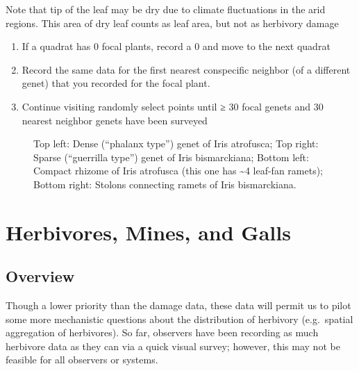 \documentclass[
  letterpaper,
  DIV=11,
  numbers=noendperiod]{scrreprt}
\begin{document}
Note that tip of the leaf may be dry due to climate fluctuations in the
arid regions. This area of dry leaf counts as leaf area, but not as
herbivory damage

\begin{enumerate}
\def\labelenumi{\arabic{enumi}.}
\setcounter{enumi}{1}
\item
  If a quadrat has 0 focal plants, record a 0 and move to the next
  quadrat
\item
  Record the same data for the first nearest conspecific neighbor (of a
  different genet) that you recorded for the focal plant.
\item
  Continue visiting randomly select points until ≥ 30 focal genets and
  30 nearest neighbor genets have been surveyed
\end{enumerate}

\begin{figure}


\caption{\label{fig-rhizo}Top left: Dense (``phalanx type'') genet of
Iris atrofusca; Top right: Sparse (``guerrilla type'') genet of Iris
bismarckiana; Bottom left: Compact rhizome of Iris atrofusca (this one
has \textasciitilde4 leaf-fan ramets); Bottom right: Stolons connecting
ramets of Iris bismarckiana.}

\end{figure}%

\chapter{Herbivores, Mines, and Galls}\label{sec-herbivore}

\section{Overview}\label{overview-4}

Though a lower priority than the damage data, these data will permit us
to pilot some more mechanistic questions about the distribution of
herbivory (e.g.~spatial aggregation of herbivores). So far, observers
have been recording as much herbivore data as they can via a quick
visual survey; however, this may not be feasible for all observers or
systems.
\end{document}
